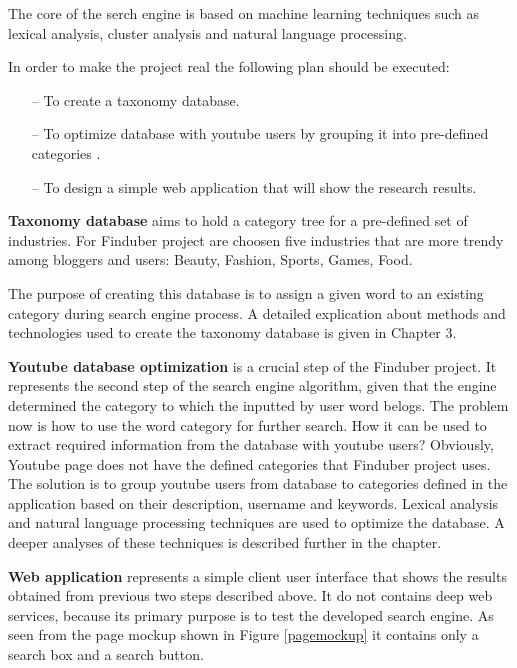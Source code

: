 The core of the serch engine is based on machine learning techniques such as lexical analysis, cluster analysis and natural language processing.

In order to make the project real the following plan should be executed:

\begin{enumerate}

\item[--] To create a taxonomy database. 

\item[--] To optimize database with youtube users by grouping it into pre-defined categories .

\item[--] To design a simple web application that will show the research results. 

\end{enumerate}

\textbf{Taxonomy database} aims to hold a category tree for a pre-defined set of industries. For Finduber project are choosen five industries that are more trendy among bloggers and users: Beauty, Fashion, Sports, Games, Food. 

The purpose of creating this database is to assign a given word to an existing category during search engine process. A detailed explication about methods and technologies used to create the taxonomy database is given in Chapter 3. 

\textbf{Youtube database optimization} is a crucial step of the Finduber project. It represents the second step of the search engine algorithm, given that the engine determined the category to which the inputted by user word belogs. The problem now is how to use the word category for further search. How it can be used to extract required information from the database with youtube users? Obviously, Youtube page does not have the defined categories that Finduber project uses. The solution is to group youtube users from database to categories defined in the application based on their description, username and keywords. Lexical analysis and natural language processing techniques are used to optimize the database. A deeper analyses of these techniques is described further in the chapter. 

\textbf{Web application} represents a simple client user interface that shows the results obtained from previous two steps described above. It do not contains deep web services, because its primary purpose is to test the developed search engine. As seen from the page mockup shown in Figure \ref{pagemockup} it contains only a search box and a search button.

